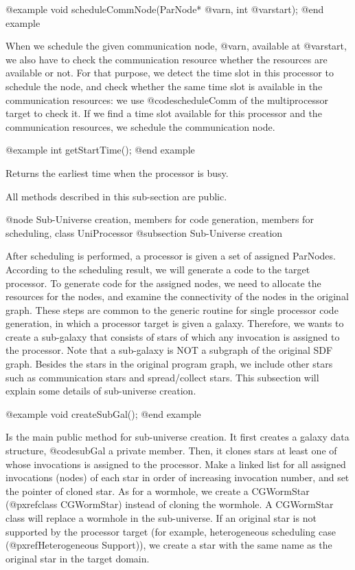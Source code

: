 @example
void scheduleCommNode(ParNode* @var{n}, int @var{start});
@end example

When we schedule the given communication node, @var{n}, available at
@var{start}, we also have to check the communication resource whether
the resources are available or not. For that purpose, we detect the time
slot in this processor to schedule the node, and check whether the
same time slot is available in the communication resources: we use
@code{scheduleComm} of the multiprocessor target to check it. If we find
a time slot available for this processor and the communication resources,
we schedule the communication node.

@example
int getStartTime();
@end example

Returns the earliest time when the processor is busy.

All methods described in this sub-section are public.

@node Sub-Universe creation, members for code generation, members for scheduling, class UniProcessor
@subsection Sub-Universe creation

After scheduling is performed, a processor is given a set of assigned 
ParNodes. According to the scheduling result, we will generate a code
to the target processor. To generate code for the assigned nodes, we need
to allocate the resources for the nodes, and examine the connectivity of
the nodes in the original graph. These steps are common to the generic
routine for single processor code generation, in which a processor target
is given a galaxy. Therefore, we wants to create a sub-galaxy
that consists of stars of which any invocation is assigned to the processor.
Note that a sub-galaxy is NOT a subgraph of the original SDF graph.
Besides the stars in the original program graph, we include other
stars such as communication stars and spread/collect stars. This subsection
will explain some details of sub-universe creation.

@example
void createSubGal();
@end example

Is the main public method for sub-universe creation. It first creates
a galaxy data structure, @code{subGal} a private member. Then, it clones
stars at least one of whose invocations is assigned to the processor.
Make a linked list for all assigned invocations (nodes) of each star 
in order of increasing invocation number, and set the pointer of cloned
star. As for a wormhole, we create a CGWormStar (@pxref{class CGWormStar})
instead of cloning the wormhole. A CGWormStar class will replace a
wormhole in the sub-universe. If an original star is not supported by the
processor target (for example, heterogeneous scheduling case
(@pxref{Heterogeneous Support})), we create
a star with the same name as the original star in the target domain.

